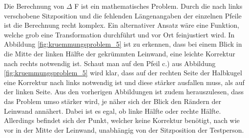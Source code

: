Die Berechnung von $\Delta$ F ist ein mathematisches Problem. Durch die nach links verschobene Sitzposition und die fehlenden Längenangaben der einzelnen Pfeile ist die Berechnung recht komplex. Ein alternativer Ansatz wäre eine Funktion, welche grob eine Transformation durchführt und vor Ort feinjustiert wird. In Abbildung \ref{fig:kruemmungsproblem_5} ist zu erkennen, dass bei einem Blick in die Mitte der linken Hälfte der gekrümmten Leinwand, eine leichte Korrektur nach rechts notwendig ist. Schaut man auf den Pfeil c.) aus Abbildung \ref{fig:kruemmungsproblem_5} wird klar, dass auf der rechten Seite der Halbkugel eine Korrektur nach links notwendig ist und diese stärker ausfallen muss, als auf der linken Seite. Aus den vorherigen Abbildungen ist zudem herauszulesen, dass das Problem umso stärker wird, je näher sich der Blick den Rändern der Leinwand annähert. Dabei ist es egal, ob linke Hälfte oder rechte Hälfte. 
Allerdings befindet sich der Punkt, welcher keine Korrektur benötigt, nach wie vor in der Mitte der Leinwand, unabhängig von der Sitzposition der Testperson.

